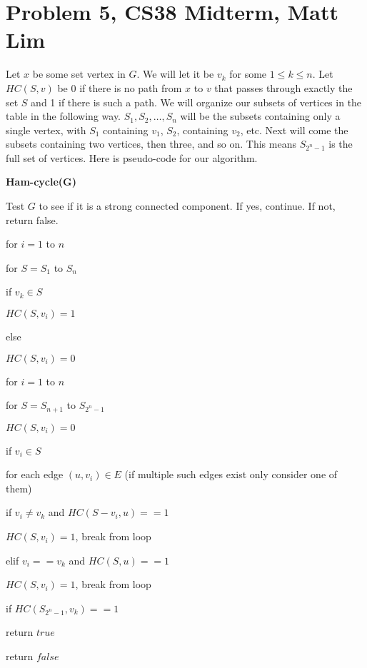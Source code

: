 \documentclass{article}
\begin{document}
\section*{Problem 5, CS38 Midterm, Matt Lim}
Let $x$ be some set vertex in $G$. We will let it be $v_k$ for some
$1 \le k \le n$. Let $HC(S,v)$ be 0 if there is no path from $x$ to $v$ that
passes through exactly the set $S$ and 1 if there is such a path. We will organize
our subsets of vertices in the table in the following way. $S_1, S_2, \dots,
S_n$ will be the subsets containing only a single vertex, with $S_1$ containing
$v_1$, $S_2$, containing $v_2$, etc. Next will come the subsets containing two
vertices, then three, and so on. This means $S_{2^n - 1}$ is the full set
of vertices.  Here is pseudo-code for our algorithm.

\vspace{5mm}
\noindent \textbf{Ham-cycle(G)}
\begin{enumerate}
    \item Test $G$ to see if it is a strong connected component. If yes,
        continue. If not, return false.
    \item for $i=1$ to $n$
    {\setlength\itemindent{25pt} \item for $S = S_1$ to $S_n$ }
    {\setlength\itemindent{50pt} \item if $v_k \in S$ }
    {\setlength\itemindent{75pt} \item $HC(S,v_i) = 1$ }
    {\setlength\itemindent{50pt} \item else }
    {\setlength\itemindent{75pt} \item $HC(S,v_i) = 0$ }
    \item for $i=1$ to $n$
    {\setlength\itemindent{25pt} \item for $S = S_{n+1}$ to $S_{2^n - 1}$ }
    {\setlength\itemindent{50pt} \item $HC(S,v_i) = 0$ }
    {\setlength\itemindent{50pt} \item if $v_i \in S$ }
    {\setlength\itemindent{75pt} \item for each edge $(u,v_i) \in E$ (if
        multiple such edges exist only consider one of them) }
    {\setlength\itemindent{100pt} \item if $v_i \neq v_k$ and $HC(S-v_i, u) == 1$ }
    {\setlength\itemindent{125pt} \item $HC(S, v_i) = 1$, break from loop }
    {\setlength\itemindent{100pt} \item elif $v_i == v_k$ and $HC(S, u) == 1$ }
    {\setlength\itemindent{125pt} \item $HC(S, v_i) = 1$, break from loop }
    \item if $HC(S_{2^n - 1}, v_k) == 1$
    {\setlength\itemindent{25pt} \item return $true$ }
    \item return $false$
\end{enumerate}
\end{document}
